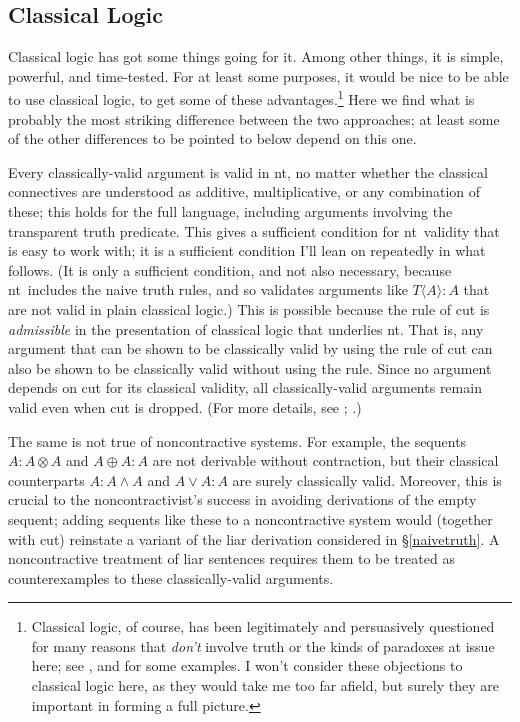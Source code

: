 \documentclass{ergoclass}
\newcommand{\sqq}[2]{\ensuremath{#1  \mathrel{:}  #2}}
\newcommand{\Tname}[1]{\T\name{#1}}
\newcommand{\name}[1]{\ensuremath{\langle #1 \rangle}}
\newcommand{\amor}{\vee}
\newcommand{\amand}{\ensuremath{\wedge}}
\newcommand{\mor}{\ensuremath{\oplus}}
\newcommand{\mand}{\ensuremath{\otimes}}
\newcommand{\T}{\ensuremath{T}}
\newcommand{\ntlog}{{\sc nt}}
\renewcommand{\cite}{\citet}						%
\begin{document}
\subsection{Classical Logic}

Classical logic has got some things going for it. Among other things, it is simple, powerful, and time-tested. For at least some purposes, it would be nice to be able to use classical logic, to get some of these advantages.\footnote{Classical logic, of course, has been legitimately and persuasively questioned for many reasons that {\em don't} involve truth or the kinds of paradoxes at issue here; see \citet*{ent1, rlr1, dummett:lbom, tennant:arl}, and \cite{bp:sa} for some examples. I won't consider these objections to classical logic here, as they would take me too far afield, but surely they are important in forming a full picture.}
Here we find what is probably the most striking difference between the two approaches; at least some of the other differences to be pointed to below depend on this one. 

Every classically-valid argument is valid in \ntlog, no matter whether the classical connectives are understood as additive, multiplicative, or any combination of these; this holds for the full language, including arguments involving the transparent truth predicate. This gives a sufficient condition for \ntlog\ validity that is easy to work with; it is a sufficient condition I'll lean on repeatedly in what follows. (It is only a sufficient condition, and not also necessary, because \ntlog\ includes the naive truth rules, and so validates arguments like $\sqq{\Tname{A}}{A}$ that are not valid in plain classical logic.) This is possible because the rule of cut is {\em admissible} in the presentation of classical logic that underlies \ntlog. That is, any argument that can be shown to be classically valid by using the rule of cut can also be shown to be classically valid without using the rule. Since no argument depends on cut for its classical validity, all classically-valid arguments remain valid even when cut is dropped. (For more details, see \citealt{ripley:pafc}; \citeyear{ripley:ru}.) 

The same is not true of noncontractive systems. For example, the sequents $\sqq{A}{A \mand A}$ and $\sqq{A \mor A}{A}$ are not derivable without contraction, but their classical counterparts $\sqq{A}{A \amand A}$ and $\sqq{A \amor A}{A}$ are surely classically valid. Moreover, this is crucial to the noncontractivist's success in avoiding derivations of the empty sequent; adding sequents like these to a noncontractive system would (together with cut) reinstate a variant of the liar derivation considered in \S\ref{naivetruth}. A noncontractive treatment of liar sentences requires them to be treated as counterexamples to these classically-valid arguments.
\end{document}
